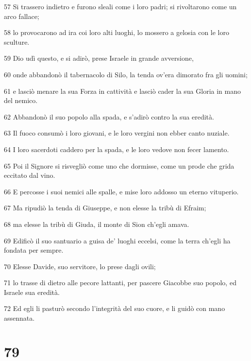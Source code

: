 \par 57 Si trassero indietro e furono sleali come i loro padri; si rivoltarono come un arco fallace;
\par 58 lo provocarono ad ira coi loro alti luoghi, lo mossero a gelosia con le loro sculture.
\par 59 Dio udì questo, e si adirò, prese Israele in grande avversione,
\par 60 onde abbandonò il tabernacolo di Silo, la tenda ov'era dimorato fra gli uomini;
\par 61 e lasciò menare la sua Forza in cattività e lasciò cader la sua Gloria in mano del nemico.
\par 62 Abbandonò il suo popolo alla spada, e s'adirò contro la sua eredità.
\par 63 Il fuoco consumò i loro giovani, e le loro vergini non ebber canto nuziale.
\par 64 I loro sacerdoti caddero per la spada, e le loro vedove non fecer lamento.
\par 65 Poi il Signore si risvegliò come uno che dormisse, come un prode che grida eccitato dal vino.
\par 66 E percosse i suoi nemici alle spalle, e mise loro addosso un eterno vituperio.
\par 67 Ma ripudiò la tenda di Giuseppe, e non elesse la tribù di Efraim;
\par 68 ma elesse la tribù di Giuda, il monte di Sion ch'egli amava.
\par 69 Edificò il suo santuario a guisa de' luoghi eccelsi, come la terra ch'egli ha fondata per sempre.
\par 70 Elesse Davide, suo servitore, lo prese dagli ovili;
\par 71 lo trasse di dietro alle pecore lattanti, per pascere Giacobbe suo popolo, ed Israele sua eredità.
\par 72 Ed egli li pasturò secondo l'integrità del suo cuore, e li guidò con mano assennata.

\chapter{79}

